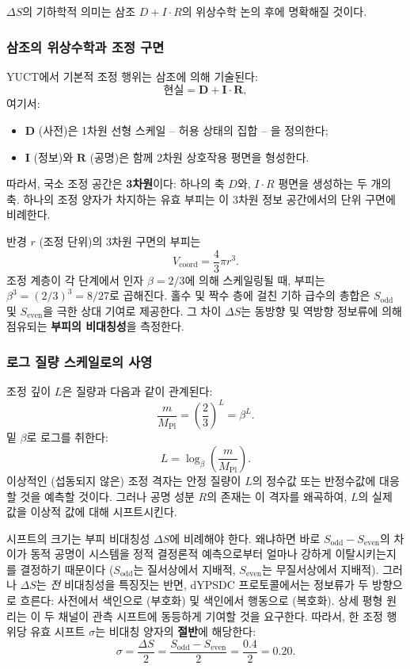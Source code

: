 \documentclass[11pt,a4paper]{article}
\begin{document}
	\(\Delta S\)의 기하학적 의미는 삼조 \(D+I\cdot R\)의 위상수학 논의 후에 명확해질 것이다.
	
	\subsubsection{삼조의 위상수학과 조정 구면}
	
	YUCT에서 기본적 조정 행위는 삼조에 의해 기술된다:
	\[
	\text{현실} = \mathbf{D} + \mathbf{I}\cdot\mathbf{R},
	\]
	여기서:
	\begin{itemize}
		\item \(\mathbf{D}\) (사전)은 1차원 선형 스케일 -- 허용 상태의 집합 -- 을 정의한다;
		\item \(\mathbf{I}\) (정보)와 \(\mathbf{R}\) (공명)은 함께 2차원 상호작용 평면을 형성한다.
	\end{itemize}
	따라서, 국소 조정 공간은 \textbf{3차원}이다: 하나의 축 \(D\)와, \(I\cdot R\) 평면을 생성하는 두 개의 축. 하나의 조정 양자가 차지하는 유효 부피는 이 3차원 정보 공간에서의 단위 구면에 비례한다.
	
	반경 \(r\) (조정 단위)의 3차원 구면의 부피는
	\[
	V_{\text{coord}} = \frac{4}{3}\pi r^3.
	\]
	조정 계층이 각 단계에서 인자 \(\beta = 2/3\)에 의해 스케일링될 때, 부피는 \(\beta^3 = (2/3)^3 = 8/27\)로 곱해진다. 홀수 및 짝수 층에 걸친 기하 급수의 총합은 \(S_{\mathrm{odd}}\) 및 \(S_{\mathrm{even}}\)을 극한 상대 기여로 제공한다. 그 차이 \(\Delta S\)는 동방향 및 역방향 정보류에 의해 점유되는 \textbf{부피의 비대칭성}을 측정한다.
	
	\subsubsection{로그 질량 스케일로의 사영}
	
	조정 깊이 \(L\)은 질량과 다음과 같이 관계된다:
	\[
	\frac{m}{M_{\mathrm{Pl}}} = \left(\frac{2}{3}\right)^L = \beta^L.
	\]
	밑 \(\beta\)로 로그를 취한다:
	\[
	L = \log_{\beta}\left(\frac{m}{M_{\mathrm{Pl}}}\right).
	\]
	이상적인 (섭동되지 않은) 조정 격자는 안정 질량이 \(L\)의 정수값 또는 반정수값에 대응할 것을 예측할 것이다. 그러나 공명 성분 \(R\)의 존재는 이 격자를 왜곡하여, \(L\)의 실제 값을 이상적 값에 대해 시프트시킨다.
	
	시프트의 크기는 부피 비대칭성 \(\Delta S\)에 비례해야 한다. 왜냐하면 바로 \(S_{\mathrm{odd}} - S_{\mathrm{even}}\)의 차이가 동적 공명이 시스템을 정적 결정론적 예측으로부터 얼마나 강하게 이탈시키는지를 결정하기 때문이다 (\(S_{\mathrm{odd}}\)는 질서상에서 지배적, \(S_{\mathrm{even}}\)는 무질서상에서 지배적). 그러나 \(\Delta S\)는 \textit{전} 비대칭성을 특징짓는 반면, dYPSDC 프로토콜에서는 정보류가 두 방향으로 흐른다: 사전에서 색인으로 (부호화) 및 색인에서 행동으로 (복호화). 상세 평형 원리는 이 두 채널이 관측 시프트에 동등하게 기여할 것을 요구한다. 따라서, 한 조정 행위당 유효 시프트 \(\sigma\)는 비대칭 양자의 \textbf{절반}에 해당한다:
	\begin{equation}
		\boxed{\sigma = \frac{\Delta S}{2} = \frac{S_{\mathrm{odd}} - S_{\mathrm{even}}}{2} = \frac{0.4}{2} = 0.20.}
		\label{eq:sigma_final}
	\end{equation}
	
\end{document}
